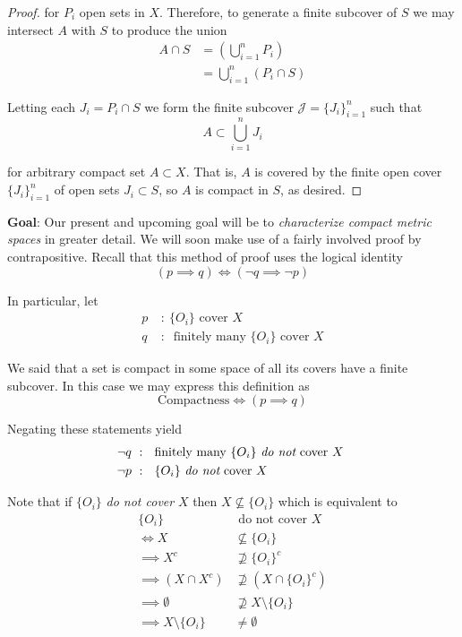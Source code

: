 \documentclass[12pt]{article}
\newlength\tindent
\renewcommand{\indent}{\hspace*{\tindent}}
\begin{document}
\begin{enumerate}
\begin{proof}
	for $P_i$ open sets in $X$. Therefore, to generate a finite subcover of $S$ we may intersect $A$ with $S$ to produce the union
	\begin{align*}
		A \cap S &= \left( \bigcup^{n}_{i = 1} P_i \right) \\
		&= \bigcup^{n}_{i = 1} \left( P_i \cap S \right) 
	\end{align*}
	
	Letting each $J_i = P_i \cap S$ we form the finite subcover $\mathcal J = \{J_i\}^n_{i = 1}$ such that
	\begin{equation*}
		A \subset \bigcup^{n}_{i = 1} J_i
	\end{equation*}
	
	for arbitrary compact set $A \subset X$. That is, $A$ is covered by the finite open cover $\{J_i\}^n_{i = 1}$ of open sets $J_i \subset S$, so $A$ is compact in $S$, as desired.
\end{proof}	
\end{enumerate}

%
%
{\bf Goal}: Our present and upcoming goal will be to {\em characterize compact metric spaces} in greater detail. We will soon make use of a fairly involved proof by contrapositive. Recall that this method of proof uses the logical identity
\begin{equation*}
	\left( p \implies q \right) \iff \left( \neg q \implies \neg p \right)
\end{equation*}

In particular, let
\begin{align*}
	p ~&:~ \{O_i\} \text{ cover $X$} \\
	q ~&:~ \text{ finitely many $\{O_i\}$ cover $X$}
\end{align*}

\indent We said that a set is compact in some space of all its covers have a finite subcover. In this case we may express this definition as
\begin{equation*}
	\text{Compactness} \iff \left( p \implies q \right)
\end{equation*}

Negating these statements yield 
\begin{align*}
	\neg q ~&:~ \text{ finitely many $\{O_i\}$ {\em do not} cover $X$ } \\
	\neg p ~&:~ \text{ $\{O_i\}$ {\em do not} cover $X$ }
\end{align*}

Note that if $\{O_i\}$ {\em do not cover} $X$ then $X \nsubseteq \{O_i\}$ which is equivalent to
\begin{align*}
	\{O_i\} &\text{ do not cover $X$} \\
	\iff X &\nsubseteq \{O_i\} \\
	\implies X^c &\nsupseteq \{O_i\}^c \\
	\implies \left(X \cap X^c\right) &\nsupseteq \left( X \cap \{O_i\}^c \right) \\
	\implies \emptyset &\nsupseteq X \setminus \{O_i\} \\
	\implies X \setminus \{O_i\} &\neq \emptyset
\end{align*}
\end{document}

